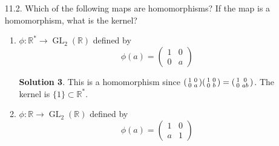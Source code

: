 \documentclass{article}
\newcommand{\RR}{\mathbb{R}}
\DeclareMathOperator{\GL}{GL}
\theoremstyle{definition}
\newtheorem*{solution}{Solution}
\begin{document}
\begin{enumerate}
\begin{enumerate}
\begin{solution}
Alternatively, note that $g\gamma g^{-1} = g\gamma g^{-1} \gamma^{-1} \gamma \in G'$ since $\gamma \in G'$ and $g\gamma g^{-1} \gamma^{-1}$ is a commutator.
\end{solution}
\item Let $N$ be a normal subgroup of $G$.  Prove that $G/N$ is abelian if and only if $N$ contains the commutator subgroup of $G$.
\begin{solution}
Suppose $a, b \in G$.  Then
\begin{align*}
(aN)(bN) = (bN)(aN) &\Leftrightarrow Nab = Nba \\
&\Leftrightarrow Naba^{-1}b^{-1} = N \\
&\Leftrightarrow aba^{-1}b^{-1} \in N.
\end{align*}
So 
\begin{align*}
\mbox{$G/N$ is abelian} &\Leftrightarrow \mbox{$(aN)(bN) = (bN)(aN)$ for all $a, b \in G$} \\
&\Leftrightarrow \mbox{$aba^{-1}b^{-1} \in N$ for all $a, b \in G$} \\
&\Leftrightarrow G' \subseteq N.
\end{align*}
\end{solution}
\end{enumerate}
\item[11.2.] Which of the following maps are homomorphisms? If the map is a homomorphism, what is the kernel?
\begin{enumerate}
\item $\phi : \RR^* \to \GL_2(\RR)$ defined by 
\[
\phi(a) = \begin{pmatrix} 1 & 0 \\ 0 & a \end{pmatrix}
\]
\begin{solution}
This is a homomorphism since $\begin{psmallmatrix} 1 & 0 \\ 0 & a \end{psmallmatrix} \begin{psmallmatrix} 1 & 0 \\ 0 & b \end{psmallmatrix} = \begin{psmallmatrix} 1 & 0 \\ 0 & ab \end{psmallmatrix}$.  The kernel is $\{1\} \subset \RR^*$.
\end{solution}
\item $\phi : \RR \to \GL_2(\RR)$ defined by 
\[
\phi(a) = \begin{pmatrix} 1 & 0 \\ a & 1 \end{pmatrix}
\]
\end{enumerate}
\end{enumerate}
\end{document}
